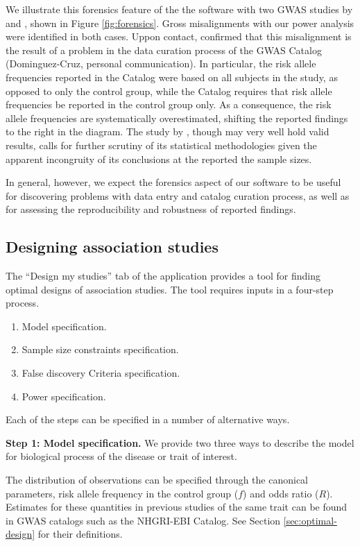We illustrate this forensics feature of the the software with two GWAS studies by \cite{dominguez2018pilot} and \cite{haryono2015pilot}, shown in Figure \ref{fig:forensics}. 
Gross misalignments with our power analysis were identified in both cases.
    Uppon contact, \cite{dominguez2018pilot} confirmed that this misalignment is the result of a problem in the data curation process of the GWAS Catalog (Dominguez-Cruz, personal communication). 
    In particular, the risk allele frequencies reported in the Catalog were based on all subjects in the study, as opposed to only the control group, while the Catalog requires that risk allele frequencies be reported in the control group only. 
    As a consequence, the risk allele frequencies are systematically overestimated, shifting the reported findings to the right in the diagram.
    The study by \cite{haryono2015pilot}, though may very well hold valid results, calls for further scrutiny of its statistical methodologies given the apparent incongruity of its conclusions at the reported the sample sizes.

In general, however, we expect the forensics aspect of our software to be useful for discovering problems with data entry and catalog curation process, as well as for assessing the reproducibility and robustness of reported findings.


\subsection{Designing association studies}
\label{sec:design-my-study}

The ``Design my studies'' tab of the application provides a tool for finding optimal designs of association studies.
The tool requires inputs in a four-step process.
\begin{enumerate}
    \item Model specification.
    \item Sample size constraints specification.
    \item False discovery Criteria specification.
    \item Power specification.
\end{enumerate}
Each of the steps can be specified in a number of alternative ways.

\bigskip
\noindent
{\bf Step 1: Model specification.}
We provide two three ways to describe the model for biological process of the disease or trait of interest.

The distribution of observations can be specified through the canonical parameters, risk allele frequency in the control group ($f$) and odds ratio ($R$).
Estimates for these quantities in previous studies of the same trait can be found in GWAS catalogs such as the NHGRI-EBI Catalog.
See Section \ref{sec:optimal-design} for their definitions.

